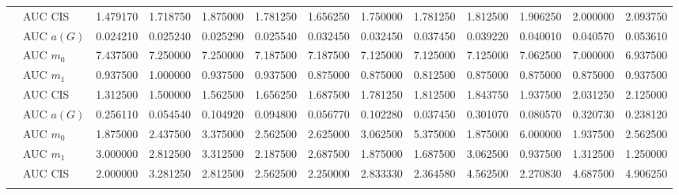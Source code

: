 \begin{table}[htbp]
\begin{tabular}{llrrrrrrrrrrr}
    & AUC CIS & 1.479170 & 1.718750 & 1.875000 & 1.781250 & 1.656250 & 1.750000 & 1.781250 & 1.812500 & 1.906250 & 2.000000 & 2.093750 \\
    \addlinespace
    \multirow{4}{*}{degree} & AUC $a(G)$ & 0.024210 & 0.025240 & 0.025290 & 0.025540 & 0.032450 & 0.032450 & 0.037450 & 0.039220 & 0.040010 & 0.040570 & 0.053610 \\
    & AUC $m_0$ & 7.437500 & 7.250000 & 7.250000 & 7.187500 & 7.187500 & 7.125000 & 7.125000 & 7.125000 & 7.062500 & 7.000000 & 6.937500 \\
    & AUC $m_1$ & 0.937500 & 1.000000 & 0.937500 & 0.937500 & 0.875000 & 0.875000 & 0.812500 & 0.875000 & 0.875000 & 0.875000 & 0.937500 \\
    & AUC CIS & 1.312500 & 1.500000 & 1.562500 & 1.656250 & 1.687500 & 1.781250 & 1.812500 & 1.843750 & 1.937500 & 2.031250 & 2.125000 \\
    \addlinespace
    \multirow{4}{*}{random} & AUC $a(G)$ & 0.256110 & 0.054540 & 0.104920 & 0.094800 & 0.056770 & 0.102280 & 0.037450 & 0.301070 & 0.080570 & 0.320730 & 0.238120 \\
    & AUC $m_0$ & 1.875000 & 2.437500 & 3.375000 & 2.562500 & 2.625000 & 3.062500 & 5.375000 & 1.875000 & 6.000000 & 1.937500 & 2.562500 \\
    & AUC $m_1$ & 3.000000 & 2.812500 & 3.312500 & 2.187500 & 2.687500 & 1.875000 & 1.687500 & 3.062500 & 0.937500 & 1.312500 & 1.250000 \\
    & AUC CIS & 2.000000 & 3.281250 & 2.812500 & 2.562500 & 2.250000 & 2.833330 & 2.364580 & 4.562500 & 2.270830 & 4.687500 & 4.906250 \\
    \addlinespace
    \bottomrule
  \end{tabular}
\end{table}


